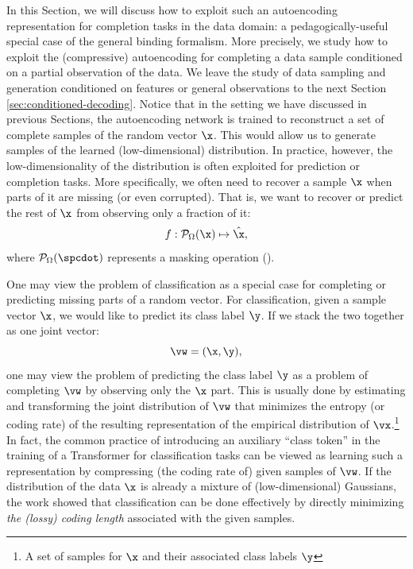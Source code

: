 \documentclass[../../book-main.tex]{subfiles}
\begin{document}
In this Section, we will discuss how to exploit such an autoencoding
representation for completion tasks in the data domain: a pedagogically-useful special case of
the general binding formalism. More precisely, we study how to exploit the
(compressive) autoencoding for completing a data sample conditioned on a partial
observation of the data. We leave the study of data sampling and generation
conditioned on features or general observations to the next Section
\ref{sec:conditioned-decoding}.
Notice that in the setting we have discussed in previous Sections, the
autoencoding network is trained to reconstruct a set of complete samples of the
random vector $\x$. This would allow us to generate samples of the learned
(low-dimensional) distribution. In practice, however, the
low-dimensionality of the distribution is often exploited for
prediction or completion tasks. More specifically, we often need to
recover a sample  $\x$ when parts of it are missing (or even
corrupted). That is, we want to recover or predict the rest of $\x$
from observing only a fraction of it:
\begin{equation}
f: \mathcal{P}_{\Omega}(\x) \mapsto \hat{\x},
\end{equation}
where $\mathcal{P}_{\Omega}(\spcdot)$ represents a masking operation
().
\begin{example}[Classification] One may view the problem of
classification as a special case for completing or predicting
missing parts of a random vector. For classification, given a
sample vector $\x$, we would like to predict its class label $\y$.
If we stack the two together as one joint vector:
\begin{equation}
  \vw = (\x, \y),
\end{equation}
one may view the problem of predicting the class label $\y$ as a
problem of completing $\vw$ by observing only the $\x$ part. This
is usually done by estimating and transforming the joint
distribution of $\vw$ that minimizes the entropy (or coding
rate) of the resulting representation of the empirical distribution
of $\vx$.\footnote{A set of samples for $\x$ and their associated
class labels $\y$} In fact, the common practice of introducing an
auxiliary ``class token'' in the training of a Transformer for
classification tasks can be viewed as learning such a
representation by compressing (the coding rate of) given samples of
$\vw$. If the distribution of the data $\x$ is already a
mixture of (low-dimensional) Gaussians, the work
\cite{wright2008classification} showed that classification can be
done effectively by directly minimizing {\em the (lossy) coding
length} associated with the given samples.
\end{example}
\end{document}
